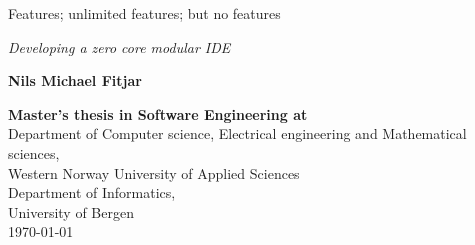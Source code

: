 
\begin{titlepage} %
  \selectfont
  \centering %


  \vspace{200pt}
  {\Huge Features; unlimited features; but no features} \\ %
  \vspace{5pt}

  {\Large \textsl{Developing a zero core modular IDE}} %
  \vspace{50pt}


  \LARGE{\textbf{Nils Michael Fitjar}}\\ %

  \vfill %



  {\Large \textbf{Master's thesis in Software Engineering at} \\
  \vspace{10pt}
  Department of Computer science, Electrical engineering and Mathematical sciences, \\
  Western Norway University of Applied Sciences \\
  \vspace{10pt}
  Department of  Informatics, \\
  University of Bergen \\}
  \vspace{10pt}
  {\large \monthyeardate\today} %


\end{titlepage}
